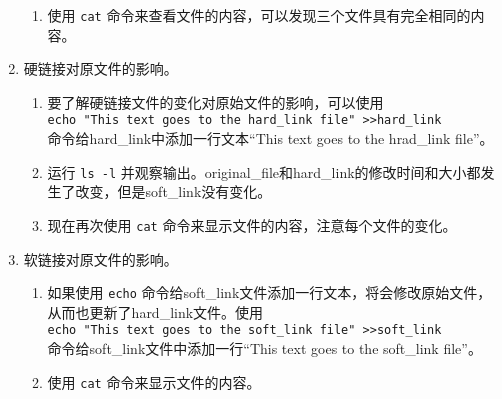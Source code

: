 \begin{enumerate}
\begin{enumerate}
      \item 使用 \verb|cat| 命令来查看文件的内容，可以发现三个文件具有完全相同的内容。
    \end{enumerate}
  \item 硬链接对原文件的影响。
    \begin{enumerate}
      \item 要了解硬链接文件的变化对原始文件的影响，可以使用\\ \verb|echo "This text goes to the hard_link file" >>hard_link| \\ 命令给hard\_link中添加一行文本“This text goes to the hrad\_link file”。
      \item 运行 \verb|ls -l| 并观察输出。original\_file和hard\_link的修改时间和大小都发生了改变，但是soft\_link没有变化。
      \item 现在再次使用 \verb|cat| 命令来显示文件的内容，注意每个文件的变化。
    \end{enumerate}
  \item 软链接对原文件的影响。
    \begin{enumerate}
      \item 如果使用 \verb|echo| 命令给soft\_link文件添加一行文本，将会修改原始文件，从而也更新了hard\_link文件。使用\\ \verb|echo "This text goes to the soft_link file" >>soft_link| \\ 命令给soft\_link文件中添加一行“This text goes to the soft\_link file”。
      \item 使用 \verb|cat| 命令来显示文件的内容。
    \end{enumerate}
\end{enumerate}

